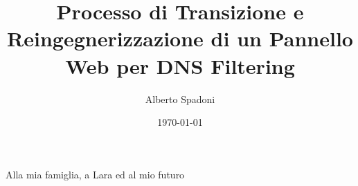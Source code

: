 \documentclass[12pt,a4paper,openright,twoside]{book}
\title{Processo di Transizione e Reingegnerizzazione di un Pannello Web per DNS Filtering}
\author{Alberto Spadoni}
\date{\today}
\begin{document}
\frontmatter\frontispiece

\renewcommand{\abstractname}{Abstract} %


\begin{dedication}
  Alla mia famiglia, a Lara ed al mio futuro
\end{dedication}

\tableofcontents
\listoffigures

\mainmatter










\backmatter

\nocite{*}




\renewcommand{\acknowledgementsname}{Ringraziamenti} %

\end{document}
